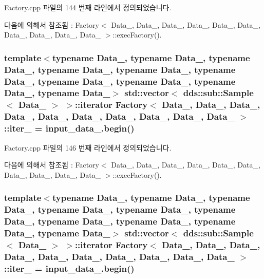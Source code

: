 Factory.\+cpp 파일의 144 번째 라인에서 정의되었습니다.



다음에 의해서 참조됨 \+:  Factory$<$ Data\+\_, Data\+\_, Data\+\_, Data\+\_, Data\+\_, Data\+\_, Data\+\_, Data\+\_, Data\+\_, Data\+\_ $>$\+::exec\+Factory().

\subsubsection[{\texorpdfstring{iter\+\_\+4}{iter_4}}]{\setlength{\rightskip}{0pt plus 5cm}template$<$typename Data\+\_, typename Data\+\_, typename Data\+\_, typename Data\+\_, typename Data\+\_, typename Data\+\_, typename Data\+\_, typename Data\+\_, typename Data\+\_, typename Data\+\_$>$ std\+::vector$<$ dds\+::sub\+::\+Sample$<$ Data\+\_ $>$ $>$\+::iterator {\bf Factory}$<$ Data\+\_, Data\+\_, Data\+\_, Data\+\_, Data\+\_, Data\+\_, Data\+\_, Data\+\_, Data\+\_, Data\+\_ $>$\+::iter\+\_ = input\+\_\+data\+\_.\+begin()}\hypertarget{classFactory_acd5df27b9212689ac21bba1db77eaf1f}{}\label{classFactory_acd5df27b9212689ac21bba1db77eaf1f}


Factory.\+cpp 파일의 146 번째 라인에서 정의되었습니다.



다음에 의해서 참조됨 \+:  Factory$<$ Data\+\_, Data\+\_, Data\+\_, Data\+\_, Data\+\_, Data\+\_, Data\+\_, Data\+\_, Data\+\_, Data\+\_ $>$\+::exec\+Factory().

\subsubsection[{\texorpdfstring{iter\+\_\+5}{iter_5}}]{\setlength{\rightskip}{0pt plus 5cm}template$<$typename Data\+\_, typename Data\+\_, typename Data\+\_, typename Data\+\_, typename Data\+\_, typename Data\+\_, typename Data\+\_, typename Data\+\_, typename Data\+\_, typename Data\+\_$>$ std\+::vector$<$ dds\+::sub\+::\+Sample$<$ Data\+\_ $>$ $>$\+::iterator {\bf Factory}$<$ Data\+\_, Data\+\_, Data\+\_, Data\+\_, Data\+\_, Data\+\_, Data\+\_, Data\+\_, Data\+\_, Data\+\_ $>$\+::iter\+\_ = input\+\_\+data\+\_.\+begin()}\hypertarget{classFactory_a6122d3e9df3241c7ce971675402efc25}{}\label{classFactory_a6122d3e9df3241c7ce971675402efc25}


